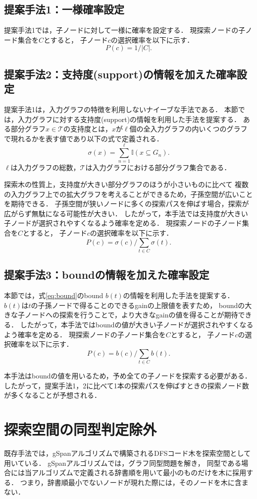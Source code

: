 \subsection{提案手法1：一様確率設定}
提案手法1では，子ノードに対して一様に確率を設定する．
現探索ノードの子ノード集合を$C$とすると，
子ノード$c$の選択確率を以下に示す．
\[
	P(c) = 1 / |C|.
\]

\subsection{提案手法2：支持度(support)の情報を加えた確率設定}
提案手法1は，入力グラフの特徴を利用しないナイーブな手法である．
本節では，入力グラフに対する支持度(support)の情報を利用した手法を提案する．
ある部分グラフ$x \in \mathcal{T}$の支持度とは，$x$が$\ell$個の全入力グラフの内いくつのグラフで現れるかを表す値であり以下の式で定義される．
\[
	\sigma(x) = \sum_{n=1}^{\ell} \mathbb{I} (x \subseteq G_n) .
\]
$\ell$は入力グラフの総数，$\mathcal{T}$は入力グラフにおける部分グラフ集合である．

探索木の性質上，支持度が大きい部分グラフのほうが小さいものに比べて
複数の入力グラフ上での拡大グラフを考えることができるため，子孫空間が広いことを期待できる．
子孫空間が狭いノードに多くの探索パスを伸ばす場合，探索が広がらず無駄になる可能性が大きい．
したがって，本手法では支持度が大きい子ノードが選択されやすくなるよう確率を定める．
現探索ノードの子ノード集合を$C$とすると，
子ノード$c$の選択確率を以下に示す．
\[
	P(c) = \sigma(c) / \sum_{t \in C} \sigma(t).
\]

\subsection{提案手法3：boundの情報を加えた確率設定}
本節では，式\eqref{eq:bound}のbound $b(t)$の情報を利用した手法を提案する．
$b(t)$は$t$の子孫ノードで得ることのできるgainの上限値を表すため，
boundの大きな子ノードへの探索を行うことで，より大きなgainの値を得ることが期待できる．
したがって，本手法ではboundの値が大きい子ノードが選択されやすくなるよう確率を定める．
現探索ノードの子ノード集合を$C$とすると，
子ノード$c$の選択確率を以下に示す．
\[
	P(c)  =  b(c) / \sum_{t \in C} b(t).
\]

本手法はboundの値を用いるため，予め全ての子ノードを探索する必要がある．
したがって，提案手法1，2に比べて1本の探索パスを伸ばすときの探索ノード数が多くなることが予想される．

\section{探索空間の同型判定除外}
\label{search space}
既存手法では，gSpan\cite{gSpan}アルゴリズムで構築されるDFSコード木を探索空間として用いている．
gSpanアルゴリズムでは，グラフ同型問題を解き，
同型である場合には当アルゴリズムで定義される辞書順を用いて最小のものだけを木に採用する．
つまり，辞書順最小でないノードが現れた際には，そのノードを木に含まない．

